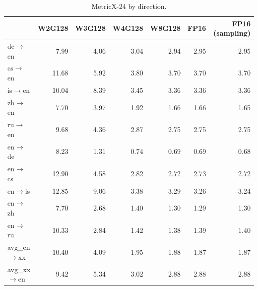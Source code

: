 \begin{table}[t]
\centering
\small
\begin{tabular}{lrrrrrr}
\toprule
& W2G128 & W3G128 & W4G128 & W8G128 & FP16 & FP16 (sampling) \\
\midrule
de$\rightarrow$en & 7.99 & 4.06 & 3.04 & 2.94 & 2.95 & 2.95 \\
cs$\rightarrow$en & 11.68 & 5.92 & 3.80 & 3.70 & 3.70 & 3.70 \\
is$\rightarrow$en & 10.04 & 8.39 & 3.45 & 3.36 & 3.36 & 3.36 \\
zh$\rightarrow$en & 7.70 & 3.97 & 1.92 & 1.66 & 1.66 & 1.65 \\
ru$\rightarrow$en & 9.68 & 4.36 & 2.87 & 2.75 & 2.75 & 2.75 \\
en$\rightarrow$de & 8.23 & 1.31 & 0.74 & 0.69 & 0.69 & 0.68 \\
en$\rightarrow$cs & 12.90 & 4.58 & 2.82 & 2.72 & 2.73 & 2.72 \\
en$\rightarrow$is & 12.85 & 9.06 & 3.38 & 3.29 & 3.26 & 3.24 \\
en$\rightarrow$zh & 7.70 & 2.68 & 1.40 & 1.30 & 1.29 & 1.30 \\
en$\rightarrow$ru & 10.33 & 2.84 & 1.42 & 1.38 & 1.39 & 1.40 \\
\midrule
avg\_en$\rightarrow$xx & 10.40 & 4.09 & 1.95 & 1.88 & 1.87 & 1.87 \\
avg\_xx$\rightarrow$en & 9.42 & 5.34 & 3.02 & 2.88 & 2.88 & 2.88 \\
\bottomrule
\end{tabular}
\caption{MetricX-24 by direction.}
\label{tab:metricx-24}
\end{table}

